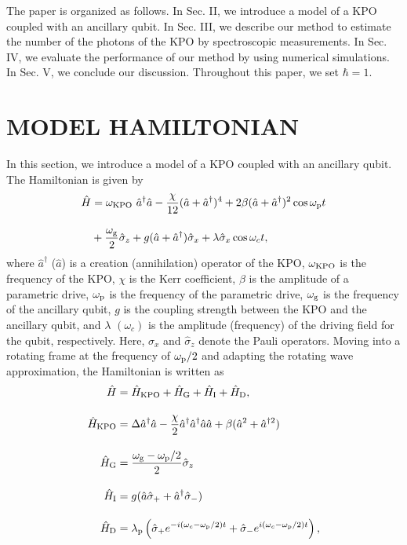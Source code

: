 The paper is organized as follows. In Sec. II, we introduce a model of a KPO coupled with an ancillary qubit. In Sec. III, we describe our method to estimate the number of the photons of the KPO by spectroscopic measurements.
In Sec. IV, we evaluate the performance of our method by using numerical simulations.
In Sec. V, we conclude our discussion.
Throughout this paper, we set $\hbar=1$.






\section{MODEL HAMILTONIAN}\label{Model}
In this section, we introduce a model of a KPO coupled 
with an ancillary qubit.
The Hamiltonian is given by
\begin{align}
    \hat{H}&=\omega_{\rm{KPO}}\ \hat{a}^\dagger\hat{a} - \frac{\chi}{12} (\hat{a}+\hat{a}^\dagger)^4 + 2\beta (\hat{a} + \hat{a}^{\dagger})^2\cos{\omega_{\rm{p}} t}\nn[10pt]
    &+\frac{\omega_{\rm{g}}}{2}\hat{\sigma}_z
    +g(\hat{a}+\hat{a}^\dagger)\hat{\sigma}_x
    +\lambda \hat{\sigma}_x \cos{\omega_c t},
\end{align}
where $\hat{a}^\dagger$ ($\hat{a}$) is a creation
(annihilation) operator of the KPO, $\omega_{\rm{KPO}}$ is the frequency of the KPO, $\chi$ is the Kerr coefficient, $\beta$ is the amplitude of a parametric drive, $\omega_{\rm{p}}$ is the frequency of the
parametric drive, $\omega_{\rm{g}}$ is the frequency of the ancillary qubit, $g$ is the coupling 
strength between the
KPO and the ancillary qubit, 
and $\lambda$ $(\omega_c)$ is the amplitude (frequency) of the driving field for the qubit, respectively. Here, $\hat{\sigma}_x$ and $\hat{\sigma}_z$ denote the Pauli operators.
Moving into a rotating frame at the frequency of $\omega_{\rm{p}}/2$ and adapting the rotating wave approximation, the Hamiltonian is written as
\begin{align}\label{total hamiltonian}
  \hat{H}&=\hat{H}_{\rm{KPO}}+\hat{H}_{\rm{G}}+\hat{H}_{\rm{I}}+\hat{H}_{\rm{D}},\\[10pt]
    \hat{H}_{\rm{KPO}}&=\Delta \hat{a}^\dagger\hat{a} - \frac{\chi}{2} \hat{a}^\dagger\hat{a}^\dagger\hat{a}\hat{a} + \beta (\hat{a}^2 + \hat{a}^{\dagger 2})\\[10pt]
    \hat{H}_{\rm{G}}&=\frac{\omega_{\rm{g}}-\omega_{\rm{p}}/2}{2}\hat{\sigma}_z\\[10pt]
    \hat{H}_{\rm{I}}&=g(\hat{a}\hat{\sigma}_{+}+\hat{a}^\dagger\hat{\sigma}_{-})\\[10pt]
    \hat{H}_{\rm{D}}&=\lambda_{\rm{p}}\left(\hat{\sigma}_+ e^{-i(\omega_c-\omega_{\rm{p}}/2)t}+\hat{\sigma}_- e^{i(\omega_c-\omega_{\rm{p}}/2)t}\right),
\end{align}
